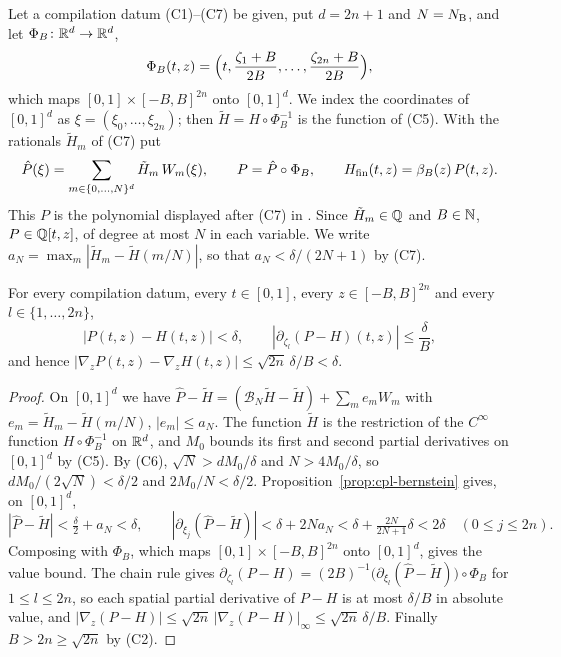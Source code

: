 \begin{definition}\label{def:cpl-Hfin}
Let a compilation datum (C1)--(C7) be given, put $d=2n+1$ and $N=N_{\rm B}$, and let $\Phi_B\colon\mathbb{R}^d\to\mathbb{R}^d$,
\[
 \Phi_B(t,z)=\Bigl(t,\frac{\zeta_1+B}{2B},\dots,\frac{\zeta_{2n}+B}{2B}\Bigr),
\]
which maps $[0,1]\times[-B,B]^{2n}$ onto $[0,1]^d$. We index the coordinates of $[0,1]^d$ as
$\xi=(\xi_0,\dots,\xi_{2n})$; then $\tilde H=H\circ\Phi_B^{-1}$ is the function of (C5). With the rationals
$\tilde H_m$ of (C7) put
\[
 \hat P(\xi)=\sum_{m\in\{0,\dots,N\}^d}\tilde H_m\,W_m(\xi),\qquad P=\hat P\circ\Phi_B,\qquad
 H_{\mathrm{fin}}(t,z)=\beta_B(z)\,P(t,z).
\]
This $P$ is the polynomial displayed after (C7) in . Since $\tilde H_m\in\mathbb{Q}$ and $B\in\mathbb{N}$,
$P\in\mathbb{Q}[t,z]$, of degree at most $N$ in each variable. We write $a_N=\max_m|\tilde H_m-\tilde H(m/N)|$, so that
$a_N<\delta/(2N+1)$ by (C7).
\end{definition}

\begin{lemma}\label{lem:cpl-poly}
For every compilation datum, every $t\in[0,1]$, every $z\in[-B,B]^{2n}$ and every $l\in\{1,\dots,2n\}$,
\[
 |P(t,z)-H(t,z)|<\delta,\qquad |\partial_{\zeta_l}(P-H)(t,z)|\le\frac\delta B,
\]
and hence $|\nabla_zP(t,z)-\nabla_zH(t,z)|\le\sqrt{2n}\,\delta/B<\delta$.
\end{lemma}

\begin{proof}
On $[0,1]^d$ we have $\hat P-\tilde H=(\mathcal B_N\tilde H-\tilde H)+\sum_me_mW_m$ with
$e_m=\tilde H_m-\tilde H(m/N)$, $|e_m|\le a_N$. The function $\tilde H$ is the restriction of the $C^\infty$
function $H\circ\Phi_B^{-1}$ on $\mathbb{R}^d$, and $M_0$ bounds its first and second partial derivatives on $[0,1]^d$ by (C5).
By (C6), $\sqrt N>dM_0/\delta$ and $N>4M_0/\delta$, so $dM_0/(2\sqrt N)<\delta/2$ and $2M_0/N<\delta/2$.
Proposition~\ref{prop:cpl-bernstein} gives, on $[0,1]^d$,
\[
 |\hat P-\tilde H|<\tfrac\delta2+a_N<\delta,\qquad
 |\partial_{\xi_j}(\hat P-\tilde H)|<\delta+2Na_N<\delta+\tfrac{2N}{2N+1}\delta<2\delta\quad(0\le j\le 2n).
\]
Composing with $\Phi_B$, which maps $[0,1]\times[-B,B]^{2n}$ onto $[0,1]^d$, gives the value bound. The chain rule
gives $\partial_{\zeta_l}(P-H)=(2B)^{-1}\bigl(\partial_{\xi_l}(\hat P-\tilde H)\bigr)\circ\Phi_B$ for
$1\le l\le2n$, so each spatial partial derivative of $P-H$ is at most $\delta/B$ in absolute value, and
$|\nabla_z(P-H)|\le\sqrt{2n}\,|\nabla_z(P-H)|_\infty\le\sqrt{2n}\,\delta/B$. Finally $B>2n\ge\sqrt{2n}$ by (C2).
\end{proof}


